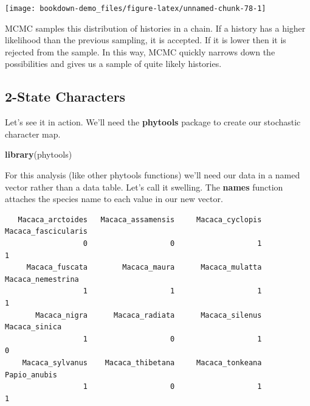 \documentclass[
]{book}
\newenvironment{Shaded}{\begin{snugshade}}{\end{snugshade}}
\newcommand{\KeywordTok}[1]{\textcolor[rgb]{0.13,0.29,0.53}{\textbf{#1}}}
\newcommand{\NormalTok}[1]{#1}
\newcommand{\OperatorTok}[1]{\textcolor[rgb]{0.81,0.36,0.00}{\textbf{#1}}}
\newcommand{\StringTok}[1]{\textcolor[rgb]{0.31,0.60,0.02}{#1}}
\begin{document}
\begin{center}\texttt{[image: bookdown-demo\_files/figure-latex/unnamed-chunk-78-1]} \end{center}

MCMC samples this distribution of histories in a chain. If a history has a higher likelihood than the previous sampling, it is accepted. If it is lower then it is rejected from the sample. In this way, MCMC quickly narrows down the possibilities and gives us a sample of quite likely histories.

\hypertarget{state-characters}{%
\subsection{2-State Characters}\label{state-characters}}

Let's see it in action. We'll need the \textbf{phytools} package \citep{phytools} to create our stochastic character map.

\begin{Shaded}
\begin{Highlighting}[]
\KeywordTok{library}\NormalTok{(phytools)}
\end{Highlighting}
\end{Shaded}

For this analysis (like other phytools functions) we'll need our data in a named vector rather than a data table. Let's call it swelling. The \textbf{names} function attaches the species name to each value in our new vector.

\begin{Shaded}
\end{Shaded}

\begin{verbatim}
   Macaca_arctoides   Macaca_assamensis     Macaca_cyclopis Macaca_fascicularis 
                  0                   0                   1                   1 
     Macaca_fuscata        Macaca_maura      Macaca_mulatta   Macaca_nemestrina 
                  1                   1                   1                   1 
       Macaca_nigra      Macaca_radiata      Macaca_silenus       Macaca_sinica 
                  1                   0                   1                   0 
    Macaca_sylvanus    Macaca_thibetana     Macaca_tonkeana        Papio_anubis 
                  1                   0                   1                   1 
\end{verbatim}
\end{document}
